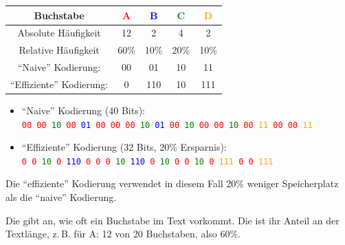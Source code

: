 \begin{table}[H]
	\centering
	\begin{tabular}{ccccc}
		\textbf{Buchstabe}        & \textbf{\textcolor{red}{A}} & \textbf{\textcolor{blue}{B}} & \textbf{\textcolor{green}{C}} & \textbf{\textcolor{orange}{D}} \\\midrule
		Absolute Häufigkeit       & 12         & 2          & 4          & 2          \\
		Relative Häufigkeit       & 60\%       & 10\%       & 20\%       & 10\%       \\
		\enquote{Naive} Kodierung:      & 00         & 01         & 10         & 11         \\
		\enquote{Effiziente} Kodierung: & 0          & 110        & 10         & 111        \\
	\end{tabular}
\end{table}
\begin{itemize}
	\item \enquote{Naive} Kodierung (40 Bits):\\ \texttt{\textcolor{red}{00} \textcolor{red}{00} \textcolor{green}{10} \textcolor{red}{00} \textcolor{blue}{01} \textcolor{red}{00} \textcolor{red}{00} \textcolor{red}{00} \textcolor{green}{10} \textcolor{blue}{01} \textcolor{red}{00} \textcolor{green}{10} \textcolor{red}{00} \textcolor{red}{00} \textcolor{green}{10} \textcolor{red}{00} \textcolor{orange}{11} \textcolor{red}{00} \textcolor{red}{00} \textcolor{orange}{11}}
	\item \enquote{Effiziente} Kodierung (32 Bits, 20\% Ersparnis):\\ \texttt{\textcolor{red}{0} \textcolor{red}{0} \textcolor{green}{10} \textcolor{red}{0} \textcolor{blue}{110} \textcolor{red}{0} \textcolor{red}{0} \textcolor{red}{0} \textcolor{green}{10} \textcolor{blue}{110} \textcolor{red}{0} \textcolor{green}{10} \textcolor{red}{0} \textcolor{red}{0} \textcolor{green}{10} \textcolor{red}{0} \textcolor{orange}{111} \textcolor{red}{0} \textcolor{red}{0} \textcolor{orange}{111}}
\end{itemize}

Die \enquote{effiziente} Kodierung verwendet in diesem Fall 20\% weniger Speicherplatz als die \enquote{naive} Kodierung.

Die  gibt an, wie oft ein Buchstabe im Text vorkommt. Die  ist ihr Anteil an der Textlänge, z.\,B. für A: 12 von 20 Buchstaben, also 60\%.

